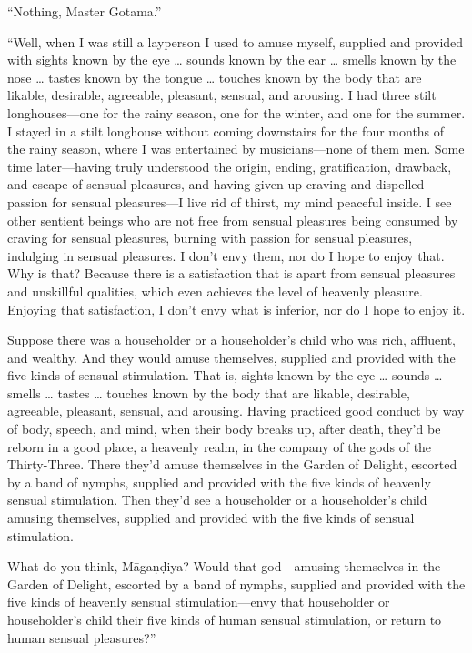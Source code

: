 \documentclass[12pt,openany]{book}%
\begin{document}
“Nothing, Master Gotama.” 

“Well, when I was still a layperson I used to amuse myself, supplied and provided with sights known by the eye … sounds known by the ear … smells known by the nose … tastes known by the tongue … touches known by the body that are likable, desirable, agreeable, pleasant, sensual, and arousing. I had three stilt longhouses—one for the rainy season, one for the winter, and one for the summer. I stayed in a stilt longhouse without coming downstairs for the four months of the rainy season, where I was entertained by musicians—none of them men. Some time later—having truly understood the origin, ending, gratification, drawback, and escape of sensual pleasures, and having given up craving and dispelled passion for sensual pleasures—I live rid of thirst, my mind peaceful inside. I see other sentient beings who are not free from sensual pleasures being consumed by craving for sensual pleasures, burning with passion for sensual pleasures, indulging in sensual pleasures. I don’t envy them, nor do I hope to enjoy that. Why is that? Because there is a satisfaction that is apart from sensual pleasures and unskillful qualities, which even achieves the level of heavenly pleasure. Enjoying that satisfaction, I don’t envy what is inferior, nor do I hope to enjoy it. 

Suppose there was a householder or a householder’s child who was rich, affluent, and wealthy. And they would amuse themselves, supplied and provided with the five kinds of sensual stimulation. That is, sights known by the eye … sounds … smells … tastes … touches known by the body that are likable, desirable, agreeable, pleasant, sensual, and arousing. Having practiced good conduct by way of body, speech, and mind, when their body breaks up, after death, they’d be reborn in a good place, a heavenly realm, in the company of the gods of the Thirty-Three. There they’d amuse themselves in the Garden of Delight, escorted by a band of nymphs, supplied and provided with the five kinds of heavenly sensual stimulation. Then they’d see a householder or a householder’s child amusing themselves, supplied and provided with the five kinds of sensual stimulation. 

What do you think, \textsanskrit{Māgaṇḍiya}? Would that god—amusing themselves in the Garden of Delight, escorted by a band of nymphs, supplied and provided with the five kinds of heavenly sensual stimulation—envy that householder or householder’s child their five kinds of human sensual stimulation, or return to human sensual pleasures?” 
\end{document}
